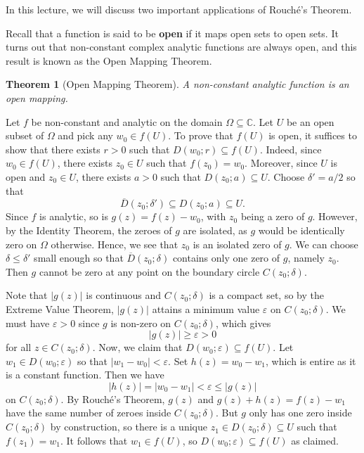 \documentclass[10pt]{article}
\makeatletter
\newcommand{\eps}{\varepsilon}
\newcommand{\C}{\mathbb{C}}
\theoremstyle{newstyle}
\newtheorem{thm}{Theorem}[section]
\newenvironment{pf}[1][\proofname]{\par
  \pushQED{\qed}%
  \normalfont \topsep0\p@\relax
  \trivlist
  \item[\hskip\labelsep\scshape
  #1\@addpunct{.}]\ignorespaces
}{%
  \popQED\endtrivlist\@endpefalse
}
\makeatother
\begin{document}
In this lecture, we will discuss two important applications of Rouch\'e's Theorem. 

Recall that a function is said to be {\bf open} if it maps open sets to open sets. 
It turns out that non-constant complex analytic functions are always open, and this result 
is known as the Open Mapping Theorem. 

\begin{thm}[Open Mapping Theorem]
A non-constant analytic function is an open mapping.
\end{thm}
\begin{pf}
Let $f$ be non-constant and analytic on the domain $\Omega \subseteq \C$. Let $U$ be an open 
subset of $\Omega$ and pick any $w_0 \in f(U)$. To prove that $f(U)$ is open, it suffices to show that 
there exists $r > 0$ such that $D(w_0; r) \subseteq f(U)$. 
Indeed, since $w_0 \in f(U)$, there exists $z_0 \in U$ such that $f(z_0) = w_0$. Moreover, 
since $U$ is open and $z_0 \in U$, there exists $a > 0$ such that $D(z_0; a) \subseteq U$. 
Choose $\delta' = a/2$ so that 
\[ \overline{D}(z_0; \delta') \subseteq D(z_0; a) \subseteq U. \] 
Since $f$ is analytic, so is $g(z) = f(z) - w_0$, with $z_0$ being a zero of $g$. However, 
by the Identity Theorem, the zeroes of $g$ are isolated, as $g$ would be identically zero on 
$\Omega$ otherwise. Hence, we see that $z_0$ is an isolated zero of $g$. We can choose 
$\delta \leq \delta'$ small enough so that $\overline{D}(z_0; \delta)$ contains only one zero of $g$, 
namely $z_0$. Then $g$ cannot be zero at any point on the boundary circle $C(z_0; \delta)$. 

Note that $|g(z)|$ is continuous and $C(z_0; \delta)$ is a compact set, so by the Extreme Value Theorem, 
$|g(z)|$ attains a minimum value $\eps$ on $C(z_0; \delta)$. We must have $\eps > 0$ 
since $g$ is non-zero on $C(z_0; \delta)$, which gives 
\[ |g(z)| \geq \eps > 0 \]
for all $z \in C(z_0; \delta)$. Now, we claim that $D(w_0; \eps) \subseteq f(U)$. 
Let $w_1 \in D(w_0; \eps)$ so that $|w_1 - w_0| < \eps$. Set $h(z) = w_0 - w_1$, which is entire 
as it is a constant function. Then we have 
\[ |h(z)| = |w_0 - w_1| < \eps \leq |g(z)| \]
on $C(z_0; \delta)$. By Rouch\'e's Theorem, $g(z)$ and $g(z) + h(z) = f(z) - w_1$ have the same 
number of zeroes inside $C(z_0; \delta)$. But $g$ only has one zero inside $C(z_0; \delta)$
by construction, so there is a unique $z_1 \in D(z_0; \delta) \subseteq U$ such that 
$f(z_1) = w_1$. It follows that $w_1 \in f(U)$, so $D(w_0; \eps) \subseteq f(U)$ as claimed. 
\end{pf}
\end{document}
